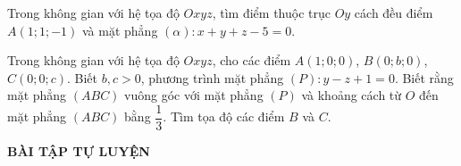 \begin{vd}%
	Trong không gian với hệ tọa độ $Oxyz$, tìm điểm thuộc trục $Oy$ cách đều điểm $A(1;1;-1)$ và mặt phẳng $(\alpha):x+y+z-5=0$.
\end{vd}
\begin{vd}%
	Trong không gian với hệ tọa độ $Oxyz$, cho các điểm $A(1;0;0)$, $B(0;b;0)$, $C(0;0;c)$. Biết $b, c>0$, phương trình mặt phẳng $(P): y-z+1=0$. Biết rằng mặt phẳng $(ABC)$ vuông góc với mặt phẳng $(P)$ và khoảng cách từ $O$ đến mặt phẳng $(ABC)$ bằng $\dfrac{1}{3}$. Tìm tọa độ các điểm $B$ và $C$.
\end{vd}
\textbf{BÀI TẬP TỰ LUYỆN }

